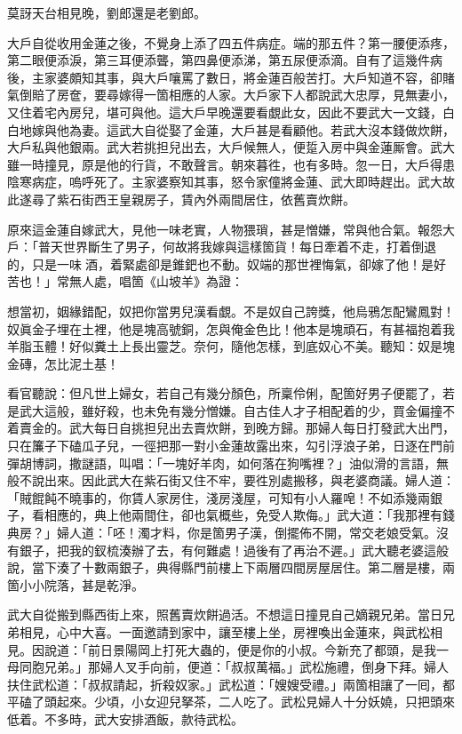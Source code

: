 \begin{myquote}
莫訝天台相見晚，劉郎還是老劉郎。{}
\end{myquote}

大戶自從收用金蓮之後，不覺身上添了四五件病症。{}端的那五件？第一腰便添疼，第二眼便添淚，第三耳便添聾，第四鼻便添涕，第五尿便添滴。自有了這幾件病後，主家婆頗知其事，與大戶嚷罵了數日，將金蓮百般苦打。大戶知道不容，卻賭氣倒賠了房奩，要尋嫁得一箇相應的人家。大戶家下人都說武大忠厚，見無妻小，又住着宅內房兒，堪可與他。這大戶早晚還要看覷此女，{}因此不要武大一文錢，白白地嫁與他為妻。這武大自從娶了金蓮，大戶甚是看顧他。若武大沒本錢做炊餅，大戶私與他銀兩。武大若挑担兒出去，大戶候無人，便踅入房中與金蓮厮會。武大雖一時撞見，原是他的行貨，不敢聲言。朝來暮徃，也有多時。忽一日，大戶得患陰寒病症，嗚呼死了。主家婆察知其事，怒令家僮將金蓮、武大即時趕出。武大故此遂尋了紫石街西王皇親房子，賃內外兩間居住，依舊賣炊餅。

原來這金蓮自嫁武大，見他一味老實，人物猥瑣，甚是憎嫌，{}常與他合氣。報怨大戶：「普天世界斷生了男子，何故將我嫁與這樣箇貨！每日牽着不走，打着倒退的，只是一味𠳹酒，着緊處卻是錐鈀也不動。奴端的那世裡悔氣，卻嫁了他！是好苦也！」常無人處，唱箇《山坡羊》為證：

\begin{myquote}
想當初，姻緣錯配，奴把你當男兒漢看覷。不是奴自己誇獎，他烏鴉怎配鸞鳳對！奴眞金子埋在土裡，他是塊高號銅，怎與俺金色比！他本是塊頑石，有甚福抱着我羊脂玉體！好似糞土上長出靈芝。奈何，隨他怎樣，到底奴心不美。聽知：奴是塊金磚，怎比泥土基！
\end{myquote}

看官聽說：但凡世上婦女，若自己有幾分顏色，所稟伶俐，配箇好男子便罷了，若是武大這般，雖好殺，也未免有幾分憎嫌。{}自古佳人才子相配着的少，買金偏撞不着賣金的。武大每日自挑担兒出去賣炊餅，到晚方歸。那婦人每日打發武大出門，只在簾子下磕瓜子兒，{}一徑把那一對小金蓮故露出來，勾引浮浪子弟，日逐在門前彈胡博詞，撒謎語，叫唱：「一塊好羊肉，如何落在狗嘴裡？」油似滑的言語，無般不說出來。因此武大在紫石街又住不牢，要徃別處搬移，與老婆商議。婦人道：「賊餛飩不曉事的，你賃人家房住，淺房淺屋，可知有小人羅唣！不如添幾兩銀子，看相應的，典上他兩間住，卻也氣概些，免受人欺侮。」武大道：「我那裡有錢典房？」婦人道：「呸！濁才料，你是箇男子漢，倒擺佈不開，常交老娘受氣。沒有銀子，把我的釵梳湊辦了去，有何難處！過後有了再治不遲。」{}武大聽老婆這般說，當下湊了十數兩銀子，典得縣門前樓上下兩層四間房屋居住。第二層是樓，兩箇小小院落，甚是乾淨。

武大自從搬到縣西街上來，照舊賣炊餅過活。不想這日撞見自己嫡親兄弟。當日兄弟相見，心中大喜。一面邀請到家中，讓至樓上坐，房裡喚出金蓮來，與武松相見。因說道：「前日景陽岡上打死大蟲的，便是你的小叔。{}今新充了都頭，是我一母同胞兄弟。」{}那婦人叉手向前，便道：「叔叔萬福。」武松施禮，倒身下拜。婦人扶住武松道：「叔叔請起，折殺奴家。」武松道：「嫂嫂受禮。」兩箇相讓了一囘，都平磕了頭起來。少頃，小女迎兒拏茶，二人吃了。武松見婦人十分妖嬈，只把頭來低着。{}不多時，武大安排酒飯，款待武松。

